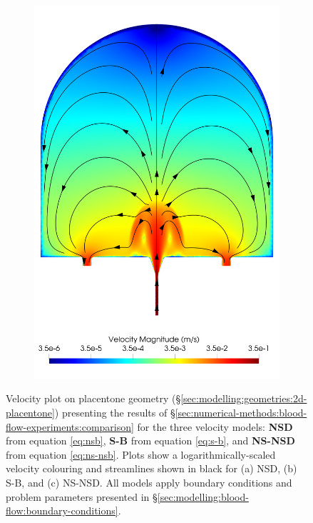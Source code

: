 \begin{figure}
\begin{subfigure}[b]{0.45\textwidth}
            \includegraphics[width=\textwidth]{diagrams/results-modelling/velocity-transport/meshandsoln_dg_velocity_placentone_ns-nsb_velocity-log.png}
            \caption{}
        \end{subfigure}
        \caption{Velocity plot on placentone geometry (\S\ref{sec:modelling:geometries:2d-placentone}) presenting the results of \S\ref{sec:numerical-methods:blood-flow-experiments:comparison} for the three velocity models: \textbf{NSD} from equation \eqref{eq:nsb}, \textbf{S-B} from equation \eqref{eq:s-b}, and \textbf{NS-NSD} from equation \eqref{eq:ns-nsb}. Plots show a logarithmically-scaled velocity colouring and streamlines shown in black for (a) NSD, (b) S-B, and (c) NS-NSD. All models apply boundary conditions and problem parameters presented in \S\ref{sec:modelling:blood-flow:boundary-conditions}.}
    \end{figure}

